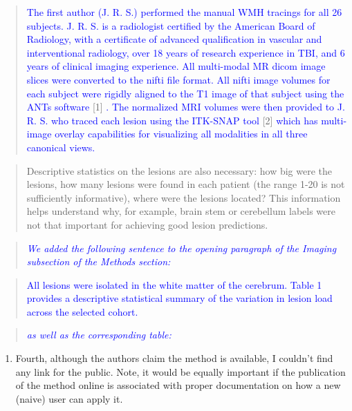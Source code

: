 \documentclass[12pt,]{article}
\providecommand{\tightlist}{%
  \setlength{\itemsep}{0pt}\setlength{\parskip}{0pt}}
\begin{document}
\begin{quote}
\textcolor{blue}{The first author (J. R. S.) performed the manual WMH tracings for all 26  subjects.  J. R. S. is a radiologist certified by the American Board of Radiology, with a certificate of advanced qualification in vascular and interventional radiology, over 18 years of research experience in TBI, and 6 years of clinical imaging experience.  All multi-modal MR dicom image slices were converted to the nifti file format. All nifti image volumes for each subject were rigidly aligned to the T1 image of that subject using the ANTs software}
{[}1{]}
\textcolor{blue}{.  The normalized MRI volumes were then provided to J. R. S. who traced each lesion using the ITK-SNAP tool}
{[}2{]}
\textcolor{blue}{ which has multi-image overlay capabilities for visualizing all modalities in all three canonical views.}
\end{quote}

\begin{quote}
Descriptive statistics on the lesions are also necessary: how big were
the lesions, how many lesions were found in each patient (the range 1-20
is not sufficiently informative), where were the lesions located? This
information helps understand why, for example, brain stem or cerebellum
labels were not that important for achieving good lesion predictions.
\end{quote}

\begin{quote}
\emph{\textcolor{blue}{We added the following sentence to the opening paragraph of the
Imaging subsection of the Methods section:}}
\end{quote}

\begin{quote}
\textcolor{blue}{All lesions were isolated in the white matter of the cerebrum.
Table 1 provides a descriptive statistical summary of the variation in lesion load across the selected cohort.}
\end{quote}

\begin{quote}
\emph{\textcolor{blue}{as well as the corresponding table:}}
\end{quote}



\clearpage

\begin{enumerate}
\def\labelenumi{\arabic{enumi}.}
\setcounter{enumi}{3}
\tightlist
\item
  Fourth, although the authors claim the method is available, I couldn't
  find any link for the public. Note, it would be equally important if
  the publication of the method online is associated with proper
  documentation on how a new (naive) user can apply it.
\end{enumerate}
\end{document}
